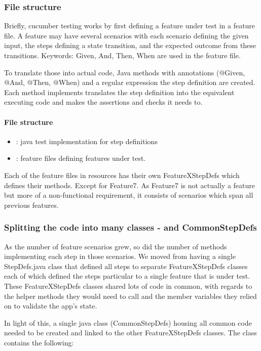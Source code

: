 \subsubsection{File structure}

Briefly, cucumber testing works by first defining a feature under test in a feature file. A feature may have several scenarios with each scenario defining the given input, the steps defining a state transition, and the expected outcome from these transitions. Keywords: Given, And, Then, When are used in the feature file. 
\par
To translate those into actual code, Java methods with annotations (@Given, @And, @Then, @When) and a regular expression the step definition are created. Each method implements translates the step definition into the equivalent executing code and makes the assertions and checks it needs to. 
\par
\paragraph{File structure}
\begin{itemize}
    \item {}: java test implementation for step definitions 
    \item {}: feature files defining features under test. 
\end{itemize}

Each of the feature files in resources has their own FeatureXStepDefs which defines their methods. Except for Feature7. As Feature7 is not actually a feature but more of a non-functional requirement, it consists of scenarios which span all previous features. 

\subsubsection{Splitting the code into many classes - and CommonStepDefs}
As the number of feature scenarios grew, so did the number of methods implementing each step in those scenarios. 
We moved from having a single StepDefs.java class that defined all steps to separate FeatureXStepDefs classes each of which defined the steps particular to a single feature that is under test.
These FeatureXStepDefs classes shared lots of code in common, with regards to the helper methods they would need to call and the member variables they relied on to validate the app's state. 
\par
In light of this, a single java class (CommonStepDefs) housing all common code needed to be created and linked to the other FeatureXStepDefs classes. The class contains the following: 

